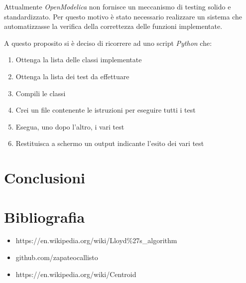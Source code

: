 \documentclass[11pt,a4paper]{report}
\begin{document}
Attualmente \textit{OpenModelica} non fornisce un meccanismo di testing solido e standardizzato. Per questo motivo è stato necessario realizzare un sistema che automatizzasse la verifica della correttezza delle funzioni implementate.

A questo proposito si è deciso di ricorrere ad uno script \textit{Python} che:

\begin{enumerate}
	\item Ottenga la lista delle classi implementate
	\item Ottenga la lista dei test da effettuare
	\item Compili le classi
	\item Crei un file contenente le istruzioni per eseguire tutti i test
	\item Esegua, uno dopo l'altro, i vari test
	\item Restituisca a schermo un output indicante l'esito dei vari test
\end{enumerate}



\pagebreak

\chapter{Conclusioni}

\chapter*{Bibliografia}

\begin{itemize}
	\item https://en.wikipedia.org/wiki/Lloyd\%27s\_algorithm
	\item github.com/zapateocallisto
	\item https://en.wikipedia.org/wiki/Centroid
\end{itemize}
\end{document}
